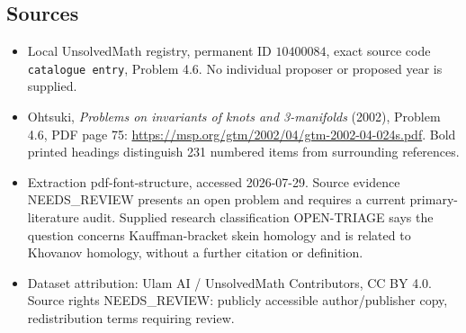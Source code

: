 \documentclass[11pt]{article}
\begin{document}
\subsection{Sources}
\begin{itemize}
\item Local UnsolvedMath registry, permanent ID \(10400084\), exact source code \texttt{catalogue entry}, Problem 4.6. No individual proposer or proposed year is supplied.
\item Ohtsuki, \emph{Problems on invariants of knots and 3-manifolds} (2002), Problem 4.6, PDF page 75: \url{https://msp.org/gtm/2002/04/gtm-2002-04-024s.pdf}. Bold printed headings distinguish 231 numbered items from surrounding references.
\item Extraction pdf-font-structure, accessed 2026-07-29. Source evidence NEEDS\_REVIEW presents an open problem and requires a current primary-literature audit. Supplied research classification OPEN-TRIAGE says the question concerns Kauffman-bracket skein homology and is related to Khovanov homology, without a further citation or definition.
\item Dataset attribution: Ulam AI / UnsolvedMath Contributors, CC BY 4.0. Source rights NEEDS\_REVIEW: publicly accessible author/publisher copy, redistribution terms requiring review.
\end{itemize}
\end{document}
